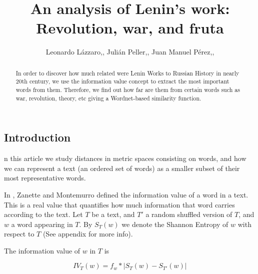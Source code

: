 \documentclass{pnastwo}
\begin{document}
\title{An analysis of Lenin's work: Revolution, war, and fruta}

\author{Leonardo Lázzaro,,
Julián Peller,,
Juan Manuel Pérez,,
}


\maketitle

\begin{article}
\begin{abstract}
In order to discover how much related were Lenin Works to Russian History in nearly 20th century, we use the information value concept to extract the most important words from them. Therefore, we find out how far are them from certain words such as
war, revolution, theory, etc giving a Wordnet-based similarity function. 
\end{abstract}



\section{Introduction}

n this article we study distances in metric spaces consisting on words, and how we can
represent a text (an ordered set of words) as a smaller subset of their most representative words.

In \cite{DARWIN}, Zanette and Montemurro defined the information value of a word in a text. This is
a real value that quantifies how much information that word carries according to the text. Let $T$ be a 
text, and $T'$ a random shuffled version of $T$, and $w$ a word appearing in $T$. 
By $S_T(w)$ we denote the Shannon Entropy of $w$ with respect to $T$ (See appendix for more info). 

The information value of $w$ in $T$ is 

\begin{equation}
  IV_T(w) = f_w* | S_T(w) - S_{T'}(w) | 
\end{equation}


\end{article}
\end{document}

